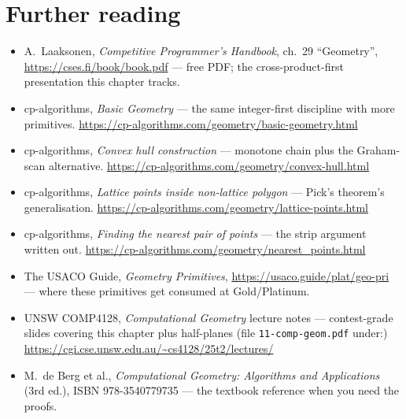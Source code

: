 \chapternotes

\section*{Further reading}
\begin{itemize}
\item A.~Laaksonen, \emph{Competitive Programmer's Handbook},
ch.~29 ``Geometry'', \url{https://cses.fi/book/book.pdf} ---
free PDF; the cross-product-first presentation this chapter
tracks.
\item cp-algorithms, \emph{Basic Geometry} --- the same
integer-first discipline with more primitives.
\newline\url{https://cp-algorithms.com/geometry/basic-geometry.html}
\item cp-algorithms, \emph{Convex hull construction} ---
monotone chain plus the Graham-scan alternative.
\newline\url{https://cp-algorithms.com/geometry/convex-hull.html}
\item cp-algorithms, \emph{Lattice points inside non-lattice
polygon} --- Pick's theorem's generalisation.
\newline\url{https://cp-algorithms.com/geometry/lattice-points.html}
\item cp-algorithms, \emph{Finding the nearest pair of
points} --- the strip argument written out.
\newline\url{https://cp-algorithms.com/geometry/nearest_points.html}
\item The USACO Guide, \emph{Geometry Primitives},
\url{https://usaco.guide/plat/geo-pri} --- where these
primitives get consumed at Gold/Platinum.
\item UNSW COMP4128, \emph{Computational Geometry} lecture
notes --- contest-grade slides covering this chapter plus
half-planes (file \texttt{11-comp-geom.pdf} under:)
\newline\url{https://cgi.cse.unsw.edu.au/~cs4128/25t2/lectures/}
\item M.~de Berg et al., \emph{Computational Geometry:
Algorithms and Applications} (3rd ed.), ISBN 978-3540779735
--- the textbook reference when you need the proofs.
\end{itemize}

